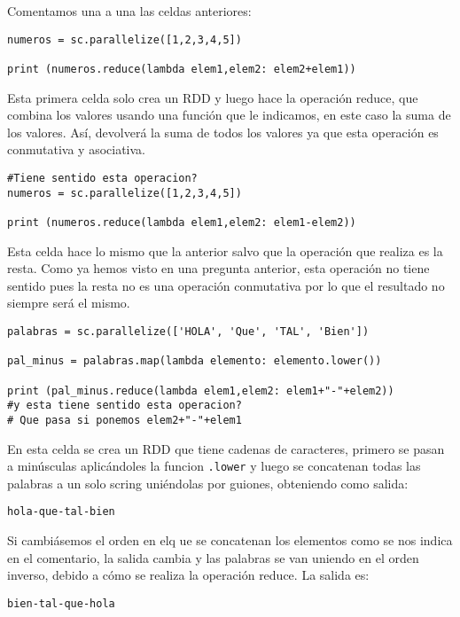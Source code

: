 \documentclass[11pt]{article}
\def\inline{\lstinline[basicstyle=\ttfamily,keywordstyle={}]}
\begin{document}
Comentamos una a una las celdas anteriores:

\begin{verbatim}
numeros = sc.parallelize([1,2,3,4,5])

print (numeros.reduce(lambda elem1,elem2: elem2+elem1))
\end{verbatim}

Esta primera celda solo crea un RDD y luego hace la operación reduce, que combina los valores usando una función que le indicamos, en este caso la suma de los valores. Así, devolverá la suma de todos los valores ya que esta operación es conmutativa y asociativa.


\begin{verbatim}
#Tiene sentido esta operacion?
numeros = sc.parallelize([1,2,3,4,5])

print (numeros.reduce(lambda elem1,elem2: elem1-elem2))
\end{verbatim}

Esta celda hace lo mismo que la anterior salvo que la operación que realiza es la resta. Como ya hemos visto en una pregunta anterior, esta operación no tiene sentido pues la resta no es una operación conmutativa por lo que el resultado no siempre será el mismo.

\begin{verbatim}
palabras = sc.parallelize(['HOLA', 'Que', 'TAL', 'Bien'])

pal_minus = palabras.map(lambda elemento: elemento.lower())

print (pal_minus.reduce(lambda elem1,elem2: elem1+"-"+elem2))
#y esta tiene sentido esta operacion?
# Que pasa si ponemos elem2+"-"+elem1
\end{verbatim}

En esta celda se crea un RDD que tiene cadenas de caracteres, primero se pasan a minúsculas aplicándoles la funcion \inline{.lower} y luego se concatenan todas las palabras a un solo scring uniéndolas por guiones, obteniendo como salida:
\begin{verbatim}
hola-que-tal-bien
\end{verbatim}

Si cambiásemos el orden en elq ue se concatenan los elementos como se nos indica en el comentario, la salida cambia y las palabras se van uniendo en el orden inverso, debido a cómo se realiza la operación reduce. La salida es:
\begin{verbatim}
bien-tal-que-hola
\end{verbatim}
\end{document}
